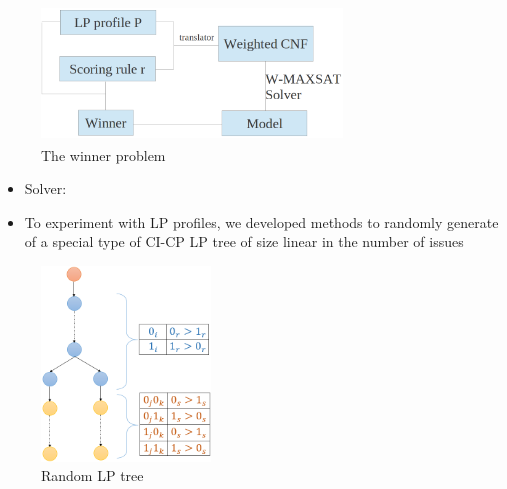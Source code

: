 {
	\begin{figure}
		\centering
		\includegraphics[width=8cm,height=3.6cm]{figs/LPTrees/sat_win_struct.png}
		\caption{The winner problem}
	\end{figure}

	\vspace{-0.45cm}

	\begin{itemize}
		\item Solver: 
	\end{itemize}
}

{
	\begin{itemize}
		\item To experiment with LP profiles, we developed methods to randomly generate
					 of
          a special type of CI-CP LP tree of size linear in the number of
          issues
	\end{itemize}

	\begin{figure}
		\vspace{-0.2cm}
		\centering
		\includegraphics[width=0.4\textwidth]{figs/LPTrees/simple_LP_tree.png}
		\vspace{-0.3cm}
		\caption{Random LP tree}
	\end{figure}
}


